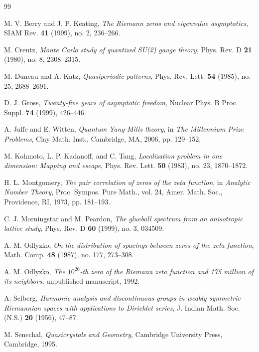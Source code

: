 \documentclass[12pt]{article}
\begin{document}

\begin{thebibliography}{99}

 M. V. Berry and J. P. Keating, \emph{The Riemann zeros and eigenvalue asymptotics}, SIAM Rev. \textbf{41} (1999), no. 2, 236--266.

 M. Creutz, \emph{Monte Carlo study of quantized SU(2) gauge theory}, Phys. Rev. D \textbf{21} (1980), no. 8, 2308--2315.

 M. Duneau and A. Katz, \emph{Quasiperiodic patterns}, Phys. Rev. Lett. \textbf{54} (1985), no. 25, 2688--2691.

 D. J. Gross, \emph{Twenty-five years of asymptotic freedom}, Nuclear Phys. B Proc. Suppl. \textbf{74} (1999), 426--446.

 A. Jaffe and E. Witten, \emph{Quantum Yang-Mills theory}, in \emph{The Millennium Prize Problems}, Clay Math. Inst., Cambridge, MA, 2006, pp. 129--152.

 M. Kohmoto, L. P. Kadanoff, and C. Tang, \emph{Localization problem in one dimension: Mapping and escape}, Phys. Rev. Lett. \textbf{50} (1983), no. 23, 1870--1872.

 H. L. Montgomery, \emph{The pair correlation of zeros of the zeta function}, in \emph{Analytic Number Theory}, Proc. Sympos. Pure Math., vol. 24, Amer. Math. Soc., Providence, RI, 1973, pp. 181--193.

 C. J. Morningstar and M. Peardon, \emph{The glueball spectrum from an anisotropic lattice study}, Phys. Rev. D \textbf{60} (1999), no. 3, 034509.

 A. M. Odlyzko, \emph{On the distribution of spacings between zeros of the zeta function}, Math. Comp. \textbf{48} (1987), no. 177, 273--308.

 A. M. Odlyzko, \emph{The $10^{20}$-th zero of the Riemann zeta function and 175 million of its neighbors}, unpublished manuscript, 1992.

 A. Selberg, \emph{Harmonic analysis and discontinuous groups in weakly symmetric Riemannian spaces with applications to Dirichlet series}, J. Indian Math. Soc. (N.S.) \textbf{20} (1956), 47--87.

 M. Senechal, \emph{Quasicrystals and Geometry}, Cambridge University Press, Cambridge, 1995.


\end{thebibliography}
\end{document}
